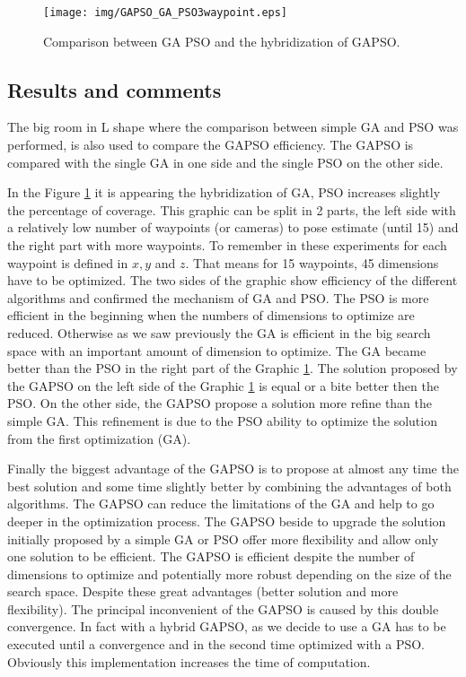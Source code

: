 \begin{figure}[t]
  \texttt{[image: img/GAPSO\_GA\_PSO3waypoint.eps]}
  \caption{Comparison between GA PSO and the hybridization of GAPSO.
}\label{fig:GAPSO}
  \endminipage\hfill
\end{figure}

 \subsection{Results and comments }
  

The big room in L shape where the comparison between simple GA and PSO was performed, is also used to compare the GAPSO efficiency. The GAPSO is compared with the single GA in one side and the single PSO on the other side. 

In the Figure \ref{fig:GAPSO} it is appearing the hybridization of GA, PSO increases slightly the percentage of coverage.%
This graphic can be split in 2 parts, the left side with a relatively low number of waypoints (or cameras) to pose estimate (until 15) and the right part with more waypoints. To remember in these experiments for each waypoint is defined in $x, y$ and $z$. That means for 15 waypoints, 45 dimensions have to be optimized.
The two sides of the graphic show efficiency of the different algorithms and confirmed the mechanism of GA and PSO.
The PSO is more efficient in the beginning when the numbers of dimensions to optimize are reduced. Otherwise as we saw previously the GA is efficient in the big search space with an important amount of dimension to optimize. The GA became better than the PSO in the right part of the Graphic \ref{fig:GAPSO}. 
The solution  proposed by the GAPSO on the left side of the Graphic \ref{fig:GAPSO} is equal or a bite better then the PSO. On the other side, the GAPSO propose a solution more refine than the simple GA. This refinement is due to the PSO ability to optimize the solution from the first optimization (GA). 

Finally the biggest advantage of the GAPSO is to propose at almost any time the best solution and some time slightly better by combining the advantages of both algorithms. 
The GAPSO can reduce the limitations of the GA and help to go deeper in the optimization process. The GAPSO  beside to upgrade the solution initially proposed by a simple GA or PSO offer more flexibility and allow only one solution to be efficient. The GAPSO is efficient despite the number of dimensions to optimize and potentially more robust depending on the size of the search space.
Despite these great advantages (better solution and more flexibility).
The principal inconvenient of the GAPSO is caused by this double convergence. In fact with a hybrid GAPSO, as we decide to use a GA has to be executed until a convergence and in the second time optimized with a PSO. Obviously this implementation increases the time of computation.
 
